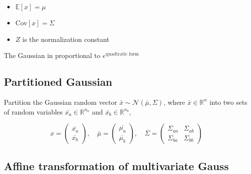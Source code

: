 \begin{itemize}
    \item $\mathbb{E}[x] = \mu$
    \item Cov$[x] = \Sigma$
    \item $Z$ is the normalization constant 
\end{itemize}

The Gaussian in proportional to $e^{\text{quadtratic form}}$

\subsection*{Partitioned Gaussian}
Partition the Gaussian random vector $\bar{x} \sim \mathcal{N} (\bar{\mu}, \Sigma)$, where
$ \bar{x} \in \mathbb{R}^{n}$ into two sets of random variables $\bar{x_a} \in \mathbb{R}^{n_a}$ and $\bar{x_b} \in \mathbb{R}^{n_b}$,

\begin{equation}
    x = \begin{pmatrix} \bar{x_a} \\ \bar{x_b} \end{pmatrix}, \quad \bar{\mu} = \begin{pmatrix} \bar{\mu_a} \\ \bar{\mu_b}  \end{pmatrix}, \quad \Sigma = \begin{pmatrix} \Sigma_{aa}&  \Sigma_{ab}\\ \Sigma_{ba}& \Sigma_{bb} \end{pmatrix} 
\end{equation}

\newpage

\subsection*{Affine transformation of multivariate Gauss}

